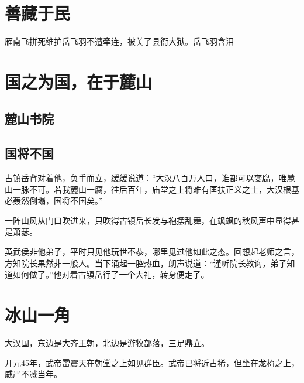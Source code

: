

\chapter{善藏于民}
雁南飞拼死维护岳飞羽不遭牵连，被关了县衙大狱。岳飞羽含泪

\section{}
\section{}
\section{}
\section{}



\chapter{国之为国，在于麓山}
\section{麓山书院}


\section{国将不国}
古镇岳背对着他，负手而立，缓缓说道：“大汉八百万人口，谁都可以变腐，唯麓山一脉不可。若我麓山一腐，往后百年，庙堂之上将难有匡扶正义之士，大汉根基必轰然倒塌，国将不国矣。”

一阵山风从门口吹进来，只吹得古镇岳长发与袍摆乱舞，在飒飒的秋风声中显得甚是萧瑟。

英武侯非他弟子，平时只见他玩世不恭，哪里见过他如此之态。回想起老师之言，方知院长果然非一般人。当下涌起一腔热血，朗声说道：“谨听院长教诲，弟子知道如何做了。”他对着古镇岳行了一个大礼，转身便走了。

\section{}


\section{}


\chapter{冰山一角}

大汉国，东边是大齐王朝，北边是游牧部落，三足鼎立。

开元45年，武帝雷震天在朝堂之上如见群臣。武帝已将近古稀，但坐在龙椅之上，威严不减当年。